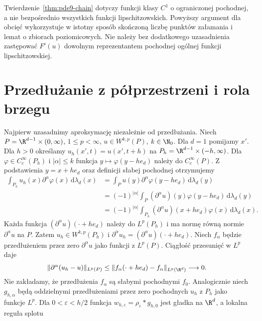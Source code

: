 \begin{uwaga}
Twierdzenie~\ref{thm:pde9-chain} dotyczy funkcji
klasy $C^1$ o ograniczonej pochodnej, a nie bezpośrednio
wszystkich funkcji lipschitzowskich. Powyższy argument
dla obcięć wykorzystuje w istotny sposób skończoną
liczbę punktów załamania i lemat o zbiorach poziomicowych.
Nie należy bez dodatkowego uzasadnienia zastępować
$F'(u)$ dowolnym reprezentantem pochodnej ogólnej
funkcji lipschitzowskiej.
\end{uwaga}

\section{Przedłużanie z półprzestrzeni i rola brzegu}
\label{sec:pde9-extension}

Najpierw uzasadnimy aproksymację niezależnie od przedłużania.
Niech $P=\R^{d-1}\times(0,\infty)$, $1\le p<\infty$,
$u\in W^{k,p}(P)$, $k\in\N_0$. Dla $d=1$ pomijamy $x'$.
Dla $h>0$ określamy $u_h(x',t)=u(x',t+h)$ na
$P_h=\R^{d-1}\times(-h,\infty)$. Dla
$\varphi\in C_c^\infty(P_h)$ i $|\alpha|\le k$
funkcja $y\mapsto\varphi(y-he_d)$ należy do
$C_c^\infty(P)$. Z podstawienia $y=x+he_d$
oraz definicji słabej pochodnej otrzymujemy
\[
 \begin{aligned}
 \int_{P_h}u_h(x)\partial^\alpha\varphi(x)\,
               \mathrm d\lambda_d(x)
 &=\int_P u(y)\partial^\alpha\varphi(y-he_d)\,
               \mathrm d\lambda_d(y)\\
 &=(-1)^{|\alpha|}\int_P(\partial^\alpha u)(y)
               \varphi(y-he_d)\,\mathrm d\lambda_d(y)\\
 &=(-1)^{|\alpha|}\int_{P_h}(\partial^\alpha u)(x+he_d)
               \varphi(x)\,\mathrm d\lambda_d(x).
 \end{aligned}
\]
Każda funkcja $(\partial^\alpha u)(\cdot+he_d)$
należy do $L^p(P_h)$ i ma normę równą normie
$\partial^\alpha u$ na $P$. Zatem $u_h\in W^{k,p}(P_h)$
i $\partial^\alpha u_h=(\partial^\alpha u)(\cdot+he_d)$.
Niech $f_\alpha$ będzie przedłużeniem przez zero
$\partial^\alpha u$ jako funkcji z $L^p(P)$.
Ciągłość przesunięć w $L^p$ daje
\[
 \|\partial^\alpha(u_h-u)\|_{L^p(P)}
 \le \|f_\alpha(\cdot+he_d)-f_\alpha\|_{L^p(\R^d)}
 \longrightarrow0.
\]
Nie zakładamy, że przedłużenia $f_\alpha$ są słabymi
pochodnymi $f_0$. Analogicznie niech $g_{h,\alpha}$
będą oddzielnymi przedłużeniami przez zero pochodnych
$u_h$ z $P_h$ jako funkcje $L^p$.
Dla $0<\varepsilon<h/2$ funkcja
$w_{h,\varepsilon}=\rho_\varepsilon*g_{h,0}$
jest gładka na $\R^d$, a lokalna reguła splotu
